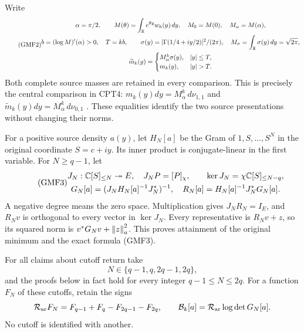 Write
\begin{equation}\tag{GMF2}
\begin{gathered}
 \alpha=\pi/2,\qquad
 M(\theta)=\int_\R e^{\theta y}w_h(y)\,dy,\quad
 M_0=M(0),\quad M_\alpha=M(\alpha),\\
 b=(\log M)'(\alpha)>0,\quad T=kb,\qquad
 \sigma(y)=|\Gamma(1/4+iy/2)|^2/(2\pi),\quad
 M_\sigma=\int_\R\sigma(y)\,dy=\sqrt{2\pi},\\
 \widetilde m_k(y)=
 \begin{cases}M_\alpha^k\sigma(y),&|y|\le T,\\
 m_k(y),&|y|>T.\end{cases}
\end{gathered}
\end{equation}
Both complete source masses are retained in every comparison.
This is precisely the central comparison in CPT4:
\(m_k(y)dy=M_\alpha^k\,d\nu_{1,1}\) and
\(\widetilde m_k(y)dy=M_\alpha^k\,d\nu_{0,1}\)
\cite{a02gmf:cpt}.  These equalities identify the two source
presentations without changing their norms.

For a positive source density \(a(y)\), let \(H_N[a]\) be the
Gram of \(1,S,\ldots,S^N\) in the original coordinate \(S=c+iy\).
Its inner product is conjugate-linear in the first variable.
For \(N\ge q-1\), let
\begin{equation}\tag{GMF3}
\begin{gathered}
 J_N:\mathbb C[S]_{\le N}\twoheadrightarrow E,\quad
                  J_NP=[P]_\chi,\qquad
 \ker J_N=\chi\mathbb C[S]_{\le N-q},\\
 G_N[a]=(J_NH_N[a]^{-1}J_N^*)^{-1},\quad
 R_N[a]=H_N[a]^{-1}J_N^*G_N[a].
\end{gathered}
\end{equation}
A negative degree means the zero space.  Multiplication gives
\(J_NR_N=I_E\), and \(R_Nv\) is orthogonal to every vector in
\(\ker J_N\).  Every representative is \(R_Nv+z\), so its squared
norm is \(v^*G_Nv+\left\lVert z\right\rVert_a^2\).
This proves attainment of the original minimum and the exact
formula (GMF3).

For all claims about cutoff return take
\[
 N\in\{q-1,q,2q-1,2q\},
\]
and the proofs below in fact hold for every integer
\(q-1\le N\le2q\).
For a function \(F_N\) of these cutoffs, retain the signs
\[
 \mathcal R_{\rm ar}F_N=F_{q-1}+F_q-F_{2q-1}-F_{2q},\qquad
 \mathcal B_k[a]=\mathcal R_{\rm ar}\log\det G_N[a].
\]
No cutoff is identified with another.

